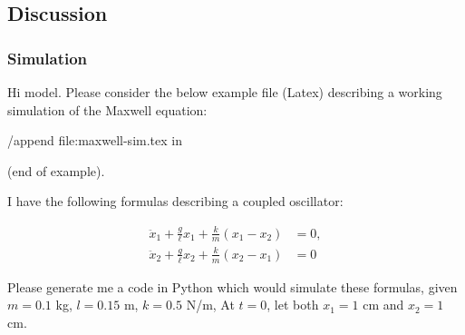 \subsection{Discussion}

\subsubsection{Simulation}
\begin{ai}

Hi model. Please consider the below example file (Latex) describing a working simulation of the
Maxwell equation:

/append file:maxwell-sim.tex in

(end of example).

I have the following formulas describing a coupled oscillator:

\[
\begin{aligned}
  \ddot{x}_1 + \frac{g}{\ell} x_1 + \frac{k}{m} (x_1 - x_2) &= 0, \\
  \ddot{x}_2 + \frac{g}{\ell} x_2 + \frac{k}{m} (x_2 - x_1) &= 0
\end{aligned}
\]

Please generate me a code in Python which would simulate these formulas, given $m=0.1$ kg, $l=0.15
$ m, $k = 0.5$ N/m, At $t=0$, let both $x_1 = 1$ cm and $x_2 = 1$ cm.

\end{ai}

